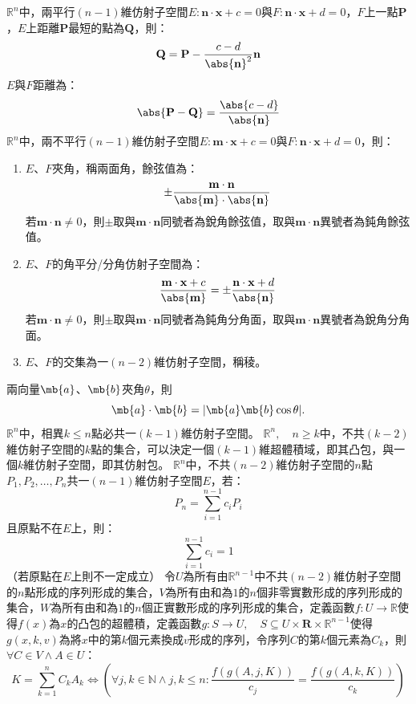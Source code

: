 \documentclass[a4paper,12pt]{report}
\begin{document}
$\mathbb{R}^n$中，兩平行$(n-1)$維仿射子空間$E\colon\mathbf{n}\cdot\mathbf{x}+c=0$與$F\colon\mathbf{n}\cdot\mathbf{x}+d=0$，$F$上一點$\mathbf{P}$，$E$上距離$\mathbf{P}$最短的點為$\mathbf{Q}$，則：
\[\mathbf{Q}=\mathbf{P}-\frac{c-d}{\abs{\mathbf{n}}^2}\mathbf{n}\]
$E$與$F$距離為：
\[\abs{\mathbf{P}-\mathbf{Q}}=\frac{\abs{c-d}}{\abs{\mathbf{n}}}\]
$\mathbb{R}^n$中，兩不平行$(n-1)$維仿射子空間$E\colon\mathbf{m}\cdot\mathbf{x}+c=0$與$F\colon\mathbf{n}\cdot\mathbf{x}+d=0$，則：
\begin{enumerate}
\item $E$、$F$夾角，稱兩面角，餘弦值為：
\[\pm\frac{\mathbf{m}\cdot\mathbf{n}}{\abs{\mathbf{m}}\cdot\abs{\mathbf{n}}}\]
若$\mathbf{m}\cdot\mathbf{n}\neq 0$，則$\pm$取與$\mathbf{m}\cdot\mathbf{n}$同號者為銳角餘弦值，取與$\mathbf{m}\cdot\mathbf{n}$異號者為鈍角餘弦值。
\item $E$、$F$的角平分/分角仿射子空間為：
\[\frac{\mathbf{m}\cdot\mathbf{x}+c}{\abs{\mathbf{m}}}=\pm\frac{\mathbf{n}\cdot\mathbf{x}+d}{\abs{\mathbf{n}}}\]
若$\mathbf{m}\cdot\mathbf{n}\neq 0$，則$\pm$取與$\mathbf{m}\cdot\mathbf{n}$同號者為鈍角分角面，取與$\mathbf{m}\cdot\mathbf{n}$異號者為銳角分角面。
\item $E$、$F$的交集為一$(n-2)$維仿射子空間，稱稜。
\end{enumerate}
兩向量$\mb{a}$、$\mb{b}$夾角$\theta$，則
\[\mb{a}\cdot\mb{b}=|\mb{a}\mb{b}\cos\theta|.\]
$\mathbb{R}^n$中，相異$k\leq n$點必共一$(k-1)$維仿射子空間。
$\mathbb{R}^n,\quad n\geq k$中，不共$(k-2)$維仿射子空間的$k$點的集合，可以決定一個$(k-1)$維超體積域，即其凸包，與一個$k$維仿射子空間，即其仿射包。
$\mathbb{R}^n$中，不共$(n-2)$維仿射子空間的$n$點$P_1,P_2,\ldots,P_n$共一$(n-1)$維仿射子空間$E$，若：
\[P_n=\sum_{i=1}^{n-1}c_iP_i\]
且原點不在$E$上，則：
\[\sum_{i=1}^{n-1}c_i=1\]
（若原點在$E$上則不一定成立）
令$U$為所有由$\mathbb{R}^{n-1}$中不共$(n-2)$維仿射子空間的$n$點形成的序列形成的集合，$V$為所有由和為$1$的$n$個非零實數形成的序列形成的集合，$W$為所有由和為$1$的$n$個正實數形成的序列形成的集合，定義函數$f\colon U\to\mathbb{R}$使得$f(x)$為$x$的凸包的超體積，定義函數$g\colon S\to U,\quad S\subseteq U\times\mathbf{R}\times\mathbb{R}^{n-1}$使得$g(x,k,v)$為將$x$中的第$k$個元素換成$v$形成的序列，令序列$C$的第$k$個元素為$C_k$，則$\forall C\in V\land A\in U$：
\[K=\sum_{k=1}^nC_kA_k\iff\left(\forall j,k\in\mathbb{N}\land j,k\leq n\colon\frac{f\left(g(A,j,K)\right)}{c_j}=\frac{f\left(g(A,k,K)\right)}{c_k}\right)\]
\end{document}
